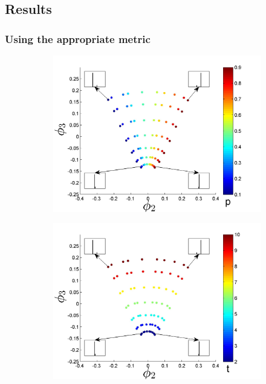 \documentclass[preprint]{elsarticle}
\begin{document}
\subsection{Results}


\subsubsection{Using the appropriate metric}

\begin{figure}[t!]
\centering
\begin{subfigure}{5cm}
\includegraphics[width=\textwidth]{EMD_withhist_p_1}
\caption{}
\label{subfig:small_lambda_p}
\end{subfigure}
\begin{subfigure}{5cm}
\includegraphics[width=\textwidth]{EMD_withhist_t_1}

\end{subfigure}
\end{figure}
\end{document}
